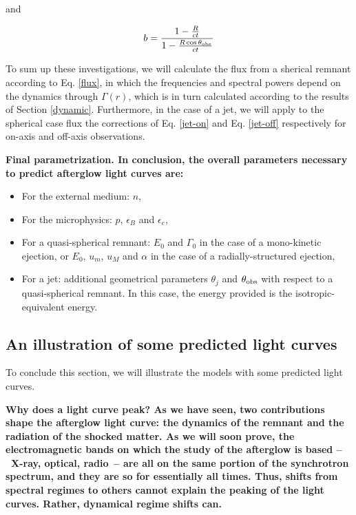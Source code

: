 and

\begin{equation}b = \frac{1 - \frac{R}{ct}}{1 - \frac{R\cos\thetaobs}{ct}}\end{equation}


To sum up these investigations, we will calculate the flux from a sherical remnant according to Eq. \ref{flux}, in which the frequencies and spectral powers depend on the dynamics through $\Gamma(r)$, which is in turn calculated according to the results of Section \ref{dynamic}. Furthermore, in the case of a jet, we will apply to the spherical case flux the corrections of Eq. \ref{jet-on} and Eq. \ref{jet-off} respectively for on-axis and off-axis observations.

\bf{Final parametrization. }In conclusion, the overall parameters necessary to predict afterglow light curves are:

\begin{itemize}
	\item For the external medium: $n$,
    \item For the microphysics: $p$, $\epsilon_B$ and $\epsilon_e$,
	\item For a quasi-spherical remnant: $E_0$ and $\Gamma_0$ in the case of a mono-kinetic ejection, or $E_0$, $u_m$, $u_M$ and $\alpha$ in the case of a radially-structured ejection,
	\item For a jet: additional geometrical parameters $\theta_j$ and $\theta_{\rm{obs}}$ with respect to a quasi-spherical remnant. In this case, the energy provided is the isotropic-equivalent energy.
\end{itemize}


\subsection{An illustration of some predicted light curves}
To conclude this section, we will illustrate the models with some predicted light curves.


\bf{Why does a light curve peak? }As we have seen, two contributions shape the afterglow light curve: the dynamics of the remnant and the radiation of the shocked matter. As we will soon prove, the electromagnetic bands on which the study of the afterglow is based --~X-ray, optical, radio~-- are all on the same portion of the synchrotron spectrum, and they are so for essentially all times. Thus, shifts from spectral regimes to others cannot explain the peaking of the light curves. Rather, dynamical regime shifts can.

